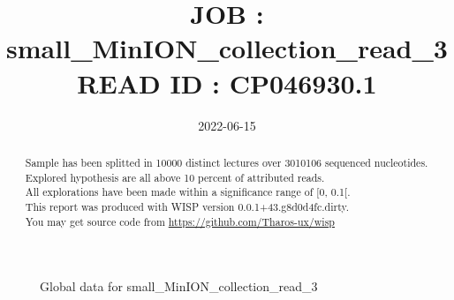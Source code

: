 \documentclass[12pt]{article}
\title{JOB : small\_MinION\_collection\_read\_3\\[0.2em]\smaller{}READ ID : CP046930.1}
\date{2022-06-15}
\begin{document}
\maketitle
\begin{abstract}
\begin{sloppypar}
Sample has been splitted in 10000 distinct lectures over 3010106 sequenced nucleotides.\\
Explored hypothesis are all above 10 percent of attributed reads.\\
All explorations have been made within a significance range of [0, 0.1[.\\
This report was produced with WISP version 0.0.1+43.g8d0d4fc.dirty. \\
You may get source code from \url{https://github.com/Tharos-ux/wisp}
\end{sloppypar}
\end{abstract}\begin{figure}[h]
\centering


\caption{Global data for small\_MinION\_collection\_read\_3}
\label{f-Global data for small\_MinION\_collection\_read\_3}
\end{figure}
\end{document}
